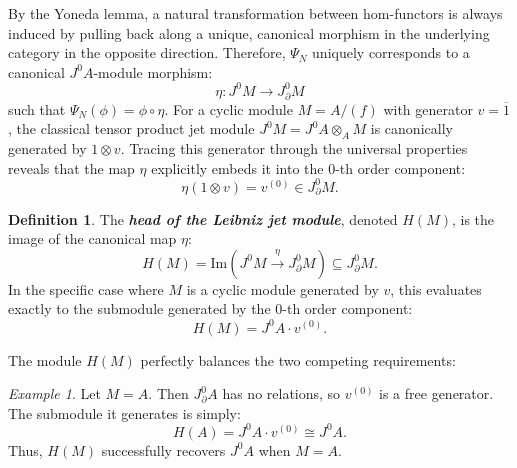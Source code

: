 \documentclass[a4paper, 12pt]{amsart}
\newcommand{\defterm}[1]{\textbf{\textit{#1}}\index{#1}}
\theoremstyle{definition}
\newtheorem{definition}[theorem]{Definition}
\theoremstyle{remark}
\newtheorem{example}[theorem]{Example}
\begin{document}
By the Yoneda lemma, a natural transformation between hom-functors is always induced by pulling back along a unique, canonical morphism in the underlying category in the opposite direction. Therefore, $\Psi_N$ uniquely corresponds to a canonical $J^0A$-module morphism:
\begin{equation*}
  \eta: J^0M \to J^0_\partial M
\end{equation*}
such that $\Psi_N(\phi) = \phi \circ \eta$. 
For a cyclic module $M = A/(f)$ with generator $v = \overline{1}$, the classical tensor product jet module $J^0M = J^0A \otimes_A M$ is canonically generated by $1 \otimes v$. Tracing this generator through the universal properties reveals that the map $\eta$ explicitly embeds it into the $0$-th order component:
\begin{equation*}
  \eta(1 \otimes v) = v^{(0)} \in J^0_\partial M.
\end{equation*}

\begin{definition}
  \label{def:head-leibniz}
  The \defterm{head of the Leibniz jet module}, denoted $H(M)$, is the image of the canonical map $\eta$:
  \begin{equation*}
    H(M) = \mathrm{Im}(J^0M \xrightarrow{\eta} J^0_\partial M) \subseteq J^0_\partial M.
  \end{equation*}
  In the specific case where $M$ is a cyclic module generated by $v$, this evaluates exactly to the submodule generated by the $0$-th order component:
  \begin{equation*}
    H(M) = J^0A \cdot v^{(0)}.
  \end{equation*}
\end{definition}

The module $H(M)$ perfectly balances the two competing requirements:

\begin{example}
  \label{exa:head-A}
  Let $M = A$. Then $J^0_\partial A$ has no relations, so $v^{(0)}$ is a free generator.
  The submodule it generates is simply:
  \begin{equation*}
    H(A) = J^0A \cdot v^{(0)} \cong J^0A.
  \end{equation*}
  Thus, $H(M)$ successfully recovers $J^0A$ when $M=A$.
\end{example}
\end{document}
